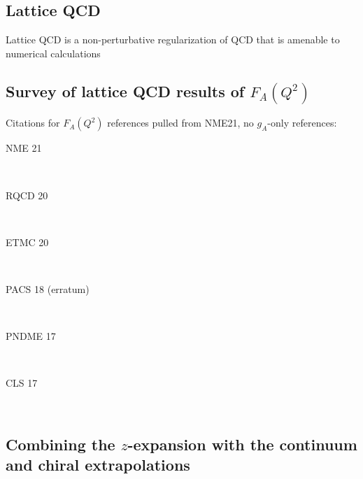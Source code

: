 \subsection{Lattice QCD\label{sec:lqcd_intro}}
Lattice QCD is a non-perturbative regularization of QCD that is amenable to numerical calculations



\subsection{Survey of lattice QCD results of $F_A(Q^2)$\label{sec:lqcd_results}}

Citations for $F_A(Q^2)$ references pulled from NME21, no $g_A$-only references:
\begin{description}
\item[NME 21]~\cite{Park:2021ypf}
\item[RQCD 20]~\cite{Bali:2018qus,RQCD:2019jai} %
\item[ETMC 20]~\cite{Alexandrou:2018sjm,Alexandrou:2019brg,Alexandrou:2020okk} %
\item[PACS 18 (erratum)]~\cite{Ishikawa:2018rew,Shintani:2018ozy} %
\item[PNDME 17]~\cite{Gupta:2017dwj,Gupta:2018qil,Jang:2019vkm,Jang:2019jkn} %
\item[CLS 17]~\cite{Hasan:2017wwt,Hasan:2019noy} %
\end{description}


\subsection{Combining the $z$-expansion with the continuum and chiral extrapolations\label{sec:z_continuum}}

